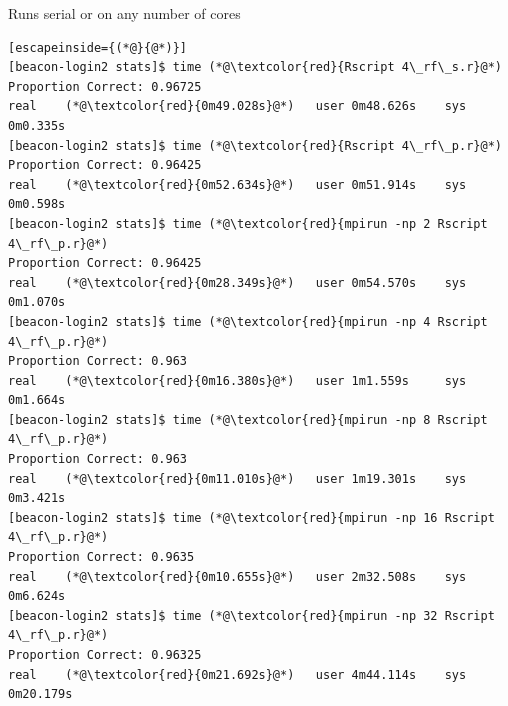 \begin{frame}[fragile]
\begin{block}{Runs serial or on any number of cores}
\vspace{-2ex}
\begin{lstlisting}[escapeinside={(*@}{@*)}]
[beacon-login2 stats]$ time (*@\textcolor{red}{Rscript 4\_rf\_s.r}@*)
Proportion Correct: 0.96725
real	(*@\textcolor{red}{0m49.028s}@*)   user	0m48.626s    sys	0m0.335s
[beacon-login2 stats]$ time (*@\textcolor{red}{Rscript 4\_rf\_p.r}@*)
Proportion Correct: 0.96425
real	(*@\textcolor{red}{0m52.634s}@*)   user	0m51.914s    sys	0m0.598s
[beacon-login2 stats]$ time (*@\textcolor{red}{mpirun -np 2 Rscript 4\_rf\_p.r}@*)
Proportion Correct: 0.96425
real	(*@\textcolor{red}{0m28.349s}@*)   user	0m54.570s    sys	0m1.070s
[beacon-login2 stats]$ time (*@\textcolor{red}{mpirun -np 4 Rscript 4\_rf\_p.r}@*)
Proportion Correct: 0.963
real	(*@\textcolor{red}{0m16.380s}@*)   user	1m1.559s     sys	0m1.664s
[beacon-login2 stats]$ time (*@\textcolor{red}{mpirun -np 8 Rscript 4\_rf\_p.r}@*)
Proportion Correct: 0.963
real	(*@\textcolor{red}{0m11.010s}@*)   user	1m19.301s    sys	0m3.421s
[beacon-login2 stats]$ time (*@\textcolor{red}{mpirun -np 16 Rscript 4\_rf\_p.r}@*)
Proportion Correct: 0.9635
real	(*@\textcolor{red}{0m10.655s}@*)   user	2m32.508s    sys	0m6.624s
[beacon-login2 stats]$ time (*@\textcolor{red}{mpirun -np 32 Rscript 4\_rf\_p.r}@*)
Proportion Correct: 0.96325
real	(*@\textcolor{red}{0m21.692s}@*)   user	4m44.114s    sys	0m20.179s
\end{lstlisting}
\end{block}
\end{frame}